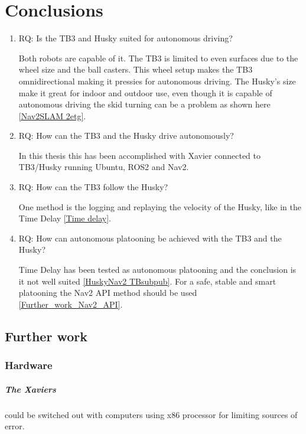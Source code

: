 \chapter{Conclusions}

\begin{enumerate}
    \item RQ: Is the TB3 and Husky suited for autonomous driving? 
    
    Both robots are capable of it. The TB3 is limited to even surfaces due to the wheel size and the ball casters. This wheel setup makes the TB3 omnidirectional making it pressies for autonomous driving. 
    The Husky's size make it great for indoor and outdoor use, even though it is capable of autonomous driving the skid turning can be a problem as shown here \ref{Nav2SLAM 2etg}.

    \item RQ: How can the TB3 and the Husky drive autonomously?

    In this thesis this has been accomplished with Xavier connected to TB3/Husky running Ubuntu, ROS2 and Nav2.
    
    \item RQ: How can the TB3 follow the Husky? 

    One method is the logging and replaying the velocity of the Husky, like in the Time Delay \ref{Time delay}. 
    
    \item RQ: How can autonomous platooning be achieved with the TB3 and the Husky? 
    
    Time Delay has been tested as autonomous platooning and the conclusion is it not well suited \ref{HuskyNav2 TBsubpub}. For a safe, stable and smart platooning the Nav2 API method should be used \ref{Further_work_Nav2_API}.
\end{enumerate}



\section{Further work} \label{Further work}

\subsection{Hardware}
\paragraph{The Xaviers} could be switched out with computers using x86 processor for limiting sources of error. 

